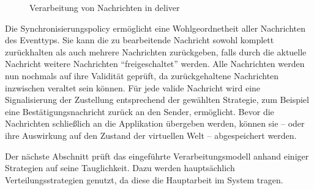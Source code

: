 \begin{figure}[htbp]
\centering
{}
\caption{Verarbeitung von Nachrichten in deliver}
\label{fig:processing_deliver}
\end{figure}


Die Synchronisierungspolicy ermöglicht eine Wohlgeordnetheit aller Nachrichten des Eventtyps. Sie kann die zu bearbeitende Nachricht sowohl komplett zurückhalten als auch mehrere Nachrichten zurückgeben, falls durch die aktuelle Nachricht weitere Nachrichten \enquote{freigeschaltet} werden. Alle Nachrichten werden nun nochmals auf ihre Validität geprüft, da zurückgehaltene Nachrichten inzwischen veraltet sein können. Für jede valide Nachricht wird eine Signalisierung der Zustellung entsprechend der gewählten Strategie, zum Beispiel eine Bestätigungsnachricht zurück an den Sender, ermöglicht. Bevor die Nachrichten schließlich an die Applikation übergeben werden, können sie -- oder ihre Auswirkung auf den Zustand der virtuellen Welt -- abgespeichert werden.


Der nächste Abschnitt prüft das eingeführte Verarbeitungsmodell anhand einiger Strategien auf seine Tauglichkeit. Dazu werden hauptsächlich Verteilungsstrategien genutzt, da diese die Hauptarbeit im System tragen.

